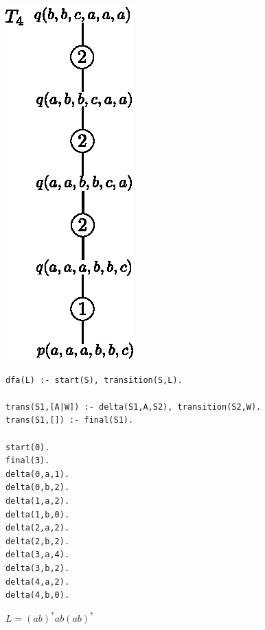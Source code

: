 \documentclass[12pt,a4paper]{amsart}
\begin{document}
\begin{aufgabe1}
\begin{center}
\includegraphics[]{t4.eps}
\end{center}
\end{aufgabe1}


\begin{aufgabe1}
\begin{verbatim}
dfa(L) :- start(S), transition(S,L).

trans(S1,[A|W]) :- delta(S1,A,S2), transition(S2,W).  
trans(S1,[]) :- final(S1).

start(0).
final(3).
delta(0,a,1).   
delta(0,b,2).
delta(1,a,2).
delta(1,b,0).
delta(2,a,2).
delta(2,b,2).
delta(3,a,4).
delta(3,b,2).
delta(4,a,2).
delta(4,b,0).
\end{verbatim}
$L=(ab)^{\ast}ab(ab)^{\ast}$
\end{aufgabe1}
\end{document}
